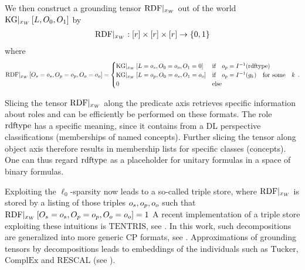 We then construct a grounding tensor ${\mathrm{RDF}}|_{x_{W}}$ out of the world $\mathrm{KG}|_{x_{W}}\left[L,O_{0},O_{1}\right]$ by
\begin{align*}
    {\mathrm{RDF}}|_{x_{W}} : [r] \times [r] \times [r] \rightarrow \{0,1\}
\end{align*}
where
\begin{align*}
    {\mathrm{RDF}}|_{x_{W}}\left[O_{s}=o_{s}, O_{p}=o_{p}, O_{o}=o_{o}\right] =
    \begin{cases}
        \mathrm{KG}|_{x_{W}}\left[L=o_{s},O_{0}=o_{o},O_{1}=0\right]
        & \text{if} \quad o_{p} = I^{-1}(\mathrm{rdftype}) \\
        \mathrm{KG}|_{x_{W}}\left[L=o_{p},O_{0}=o_{s},O_{1}=o_{o}\right]
        & \text{if} \quad o_{p} = I^{-1}(g_{k}) \quad \text{for some} \quad k \\
        0  \quad & \text{else}
    \end{cases} \, .
\end{align*}


Slicing the tensor ${\mathrm{RDF}}|_{x_{W}}$ along the predicate axis retrieves specific information about roles and can be efficiently be performed on these formats.
The role $\mathrm{rdftype}$ has a specific meaning, since it contains from a DL perspective classifications (memberships of named concepts).
Further slicing the tensor along object axis therefore results in membership lists for specific classes (concepts).
One can thus regard $\mathrm{rdftype}$ as a placeholder for unitary formulas in a space of binary formulas.

Exploiting the $\ell_0$-sparsity now leads to a so-called triple store, where ${\mathrm{RDF}}|_{x_{W}}$ is stored by a listing of those triples $o_{s},o_{p},o_{o}$ such that ${\mathrm{RDF}}|_{x_{W}}\left[O_{s}=o_{s}, O_{p}=o_{p}, O_{o}=o_{o}\right]=1$
A recent implementation of a triple store exploiting these intuitions is $\mathrm{TENTRIS}$, see \cite{bigerl_tentris_2020}.
In this work, such decompositions are generalized into more generic CP formats, see .
Approximations of grounding tensors by decompositions leads to embeddings of the individuals such as $\mathrm{Tucker}$, $\mathrm{ComplEx}$ and $\mathrm{RESCAL}$ (see \cite{nickel_review_2016}).

